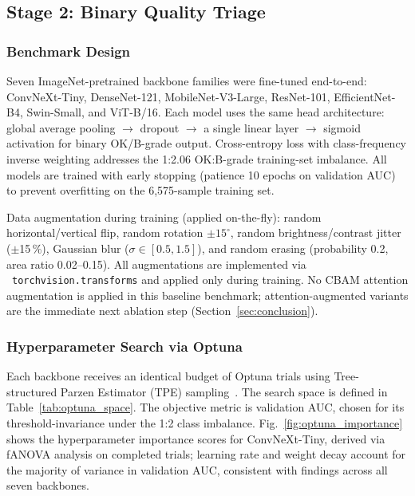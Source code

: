 \documentclass[conference]{IEEEtran}
\begin{document}
\subsection{Stage 2: Binary Quality Triage}
\label{sec:stage2}

\subsubsection{Benchmark Design}
Seven ImageNet-pretrained backbone families were fine-tuned end-to-end: ConvNeXt-Tiny, DenseNet-121, MobileNet-V3-Large, ResNet-101, EfficientNet-B4, Swin-Small, and ViT-B/16. Each model uses the same head architecture: global average pooling $\to$ dropout $\to$ a single linear layer $\to$ sigmoid activation for binary OK/B-grade output. Cross-entropy loss with class-frequency inverse weighting addresses the 1:2.06 OK:B-grade training-set imbalance. All models are trained with early stopping (patience 10 epochs on validation AUC) to prevent overfitting on the 6{,}575-sample training set.

Data augmentation during training (applied on-the-fly): random horizontal/vertical flip, random rotation $\pm15^\circ$, random brightness/contrast jitter ($\pm$15\,\%), Gaussian blur ($\sigma \in [0.5, 1.5]$), and random erasing (probability 0.2, area ratio 0.02--0.15). All augmentations are implemented via \ \texttt{torchvision.transforms} and applied only during training. No CBAM attention augmentation is applied in this baseline benchmark; attention-augmented variants are the immediate next ablation step (Section~\ref{sec:conclusion}).

\subsubsection{Hyperparameter Search via Optuna}
Each backbone receives an identical budget of Optuna trials using Tree-structured Parzen Estimator (TPE) sampling~\cite{akiba2019}. The search space is defined in Table~\ref{tab:optuna_space}. The objective metric is validation AUC, chosen for its threshold-invariance under the 1:2 class imbalance. Fig.~\ref{fig:optuna_importance} shows the hyperparameter importance scores for ConvNeXt-Tiny, derived via fANOVA analysis on completed trials; learning rate and weight decay account for the majority of variance in validation AUC, consistent with findings across all seven backbones.
\end{document}
